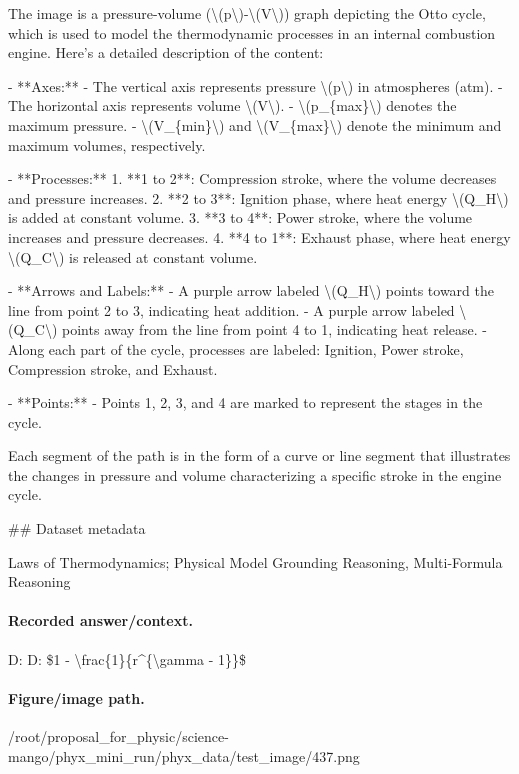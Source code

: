 The image is a pressure-volume (\textbackslash{}(p\textbackslash{})-\textbackslash{}(V\textbackslash{})) graph depicting the Otto cycle, which is used to model the thermodynamic processes in an internal combustion engine. Here’s a detailed description of the content:

- **Axes:**
  - The vertical axis represents pressure \textbackslash{}(p\textbackslash{}) in atmospheres (atm).
  - The horizontal axis represents volume \textbackslash{}(V\textbackslash{}).
  - \textbackslash{}(p\_\{max\}\textbackslash{}) denotes the maximum pressure. 
  - \textbackslash{}(V\_\{min\}\textbackslash{}) and \textbackslash{}(V\_\{max\}\textbackslash{}) denote the minimum and maximum volumes, respectively.

- **Processes:**
  1. **1 to 2**: Compression stroke, where the volume decreases and pressure increases.
  2. **2 to 3**: Ignition phase, where heat energy \textbackslash{}(Q\_H\textbackslash{}) is added at constant volume.
  3. **3 to 4**: Power stroke, where the volume increases and pressure decreases.
  4. **4 to 1**: Exhaust phase, where heat energy \textbackslash{}(Q\_C\textbackslash{}) is released at constant volume.

- **Arrows and Labels:**
  - A purple arrow labeled \textbackslash{}(Q\_H\textbackslash{}) points toward the line from point 2 to 3, indicating heat addition.
  - A purple arrow labeled \textbackslash{}(Q\_C\textbackslash{}) points away from the line from point 4 to 1, indicating heat release.
  - Along each part of the cycle, processes are labeled: Ignition, Power stroke, Compression stroke, and Exhaust.

- **Points:**
  - Points 1, 2, 3, and 4 are marked to represent the stages in the cycle.

Each segment of the path is in the form of a curve or line segment that illustrates the changes in pressure and volume characterizing a specific stroke in the engine cycle.

\#\# Dataset metadata

Laws of Thermodynamics; Physical Model Grounding Reasoning, Multi-Formula Reasoning

\paragraph{Recorded answer/context.}
D: D: \$1 - \textbackslash{}frac\{1\}\{r\textasciicircum{}\{\textbackslash{}gamma - 1\}\}\$

\paragraph{Figure/image path.}
/root/proposal\_for\_physic/science-mango/phyx\_mini\_run/phyx\_data/test\_image/437.png

